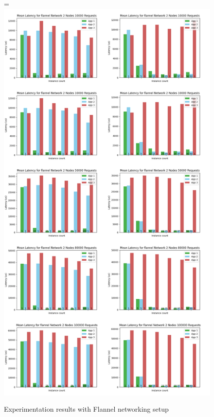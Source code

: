\documentclass[12pt,oneandhalf,chaparabic,ceng,ms,eng,oneside,pntc]{gsufbe}
\makeatletter
\let\old@includegraphics\includegraphics
\renewcommand{\includegraphics}[2][,]{%
  \setbox9=\hbox{\old@includegraphics[#1]{#2}}%
  \ifdim\wd9>\textwidth
    \old@includegraphics[#1,width=\textwidth]{#2}%
  \else
    \old@includegraphics[#1]{#2}%
  \fi%
}
\makeatother
\begin{document}
\begin{figure}
\centering
\includegraphics[]{flannel.png}
\caption{Experimentation results with Flannel networking setup}
\label{rnp1}
\end{figure}
\end{document}
